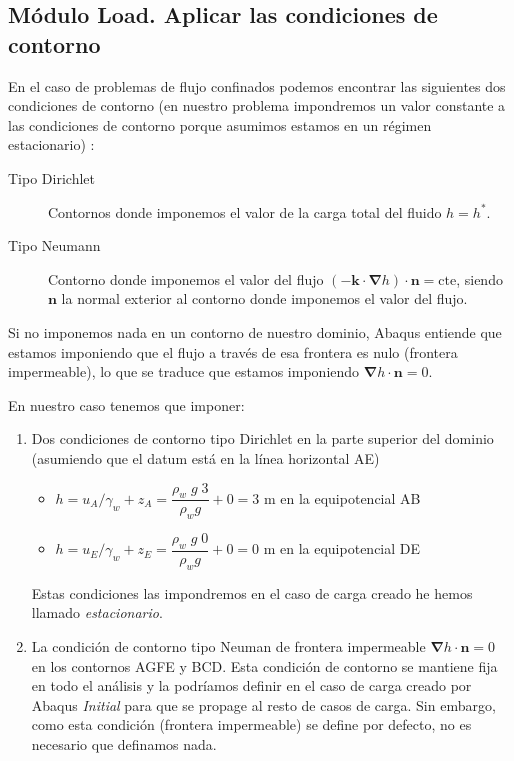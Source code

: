   \subsection{Módulo Load. Aplicar las condiciones de contorno}

  En el caso de problemas de flujo confinados podemos encontrar las
  siguientes dos condiciones de contorno (en nuestro problema
  impondremos un valor constante a las condiciones de contorno porque
  asumimos estamos en un régimen estacionario) :
  \begin{description}
  \item[Tipo Dirichlet] Contornos donde imponemos el valor de la carga
    total del fluido $h=h^*$.
  \item[Tipo Neumann] Contorno donde imponemos el valor del flujo
    $(-\textbf{k}\cdot\bm{\nabla}h)\cdot\textbf{n}=\mathrm{cte}$,
    siendo $\textbf{n}$ la normal exterior al contorno donde imponemos
    el valor del flujo.
  \end{description}

  Si no imponemos nada en un contorno de nuestro dominio, Abaqus
  entiende que estamos imponiendo que el flujo a través de esa
  frontera es nulo (frontera impermeable), lo que se traduce que
  estamos imponiendo $ \bm{\nabla}h\cdot\textbf{n}=0$.

  En nuestro caso tenemos que imponer:
  \begin{enumerate}
  \item Dos condiciones de contorno tipo Dirichlet en la parte
    superior del dominio (asumiendo que el datum está en la línea
    horizontal AE)
    \begin{itemize}
    \item $h=u_A/\gamma_w+z_A=\dfrac{\rho_w\; g\; 3}{\rho_w g}+0 = 3$
      m en la equipotencial AB
    \item $h=u_E/\gamma_w+z_E= \dfrac{\rho_w\; g\; 0}{\rho_w g}+0=0$ m
      en la equipotencial DE
    \end{itemize}
    Estas condiciones las impondremos en el caso de carga creado he
    hemos llamado \textit{estacionario}.
  \item La condición de contorno tipo Neuman de frontera impermeable $
    \bm{\nabla}h\cdot\textbf{n}=0$ en los contornos AGFE y BCD. Esta
    condición de contorno se mantiene fija en todo el análisis y la
    podríamos definir en el caso de carga creado por Abaqus
    \textit{Initial} para que se propage al resto de casos de
    carga. Sin embargo, como esta condición (frontera impermeable) se
    define por defecto, no es necesario que definamos nada.
  \end{enumerate}

